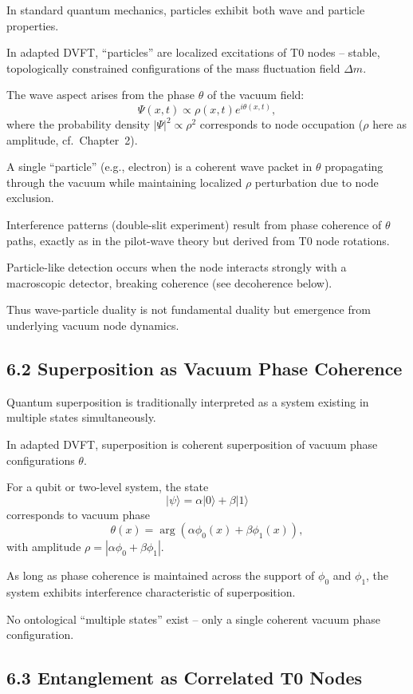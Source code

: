 	In standard quantum mechanics, particles exhibit both wave and particle properties.
	
	In adapted DVFT, ``particles'' are localized excitations of T0 nodes – stable, topologically constrained configurations of the mass fluctuation field $\Delta m$.
	
	The wave aspect arises from the phase $\theta$ of the vacuum field:
	\[
	\Psi(x,t) \propto \rho(x,t) e^{i\theta(x,t)},
	\]
	where the probability density $|\Psi|^2 \propto \rho^2$ corresponds to node occupation ($\rho$ here as amplitude, cf.\ Chapter~2).
	
	A single ``particle'' (e.g., electron) is a coherent wave packet in $\theta$ propagating through the vacuum while maintaining localized $\rho$ perturbation due to node exclusion.
	
	Interference patterns (double-slit experiment) result from phase coherence of $\theta$ paths, exactly as in the pilot-wave theory but derived from T0 node rotations.
	
	Particle-like detection occurs when the node interacts strongly with a macroscopic detector, breaking coherence (see decoherence below).
	
	Thus wave-particle duality is not fundamental duality but emergence from underlying vacuum node dynamics.
	
	\subsection{6.2 Superposition as Vacuum Phase Coherence}
	
	Quantum superposition is traditionally interpreted as a system existing in multiple states simultaneously.
	
	In adapted DVFT, superposition is coherent superposition of vacuum phase configurations $\theta$.
	
	For a qubit or two-level system, the state
	\[
	|\psi\rangle = \alpha |0\rangle + \beta |1\rangle
	\]
	corresponds to vacuum phase
	\[
	\theta(x) = \arg(\alpha \phi_0(x) + \beta \phi_1(x)),
	\]
	with amplitude $\rho = |\alpha \phi_0 + \beta \phi_1|$.
	
	As long as phase coherence is maintained across the support of $\phi_0$ and $\phi_1$, the system exhibits interference characteristic of superposition.
	
	No ontological ``multiple states'' exist – only a single coherent vacuum phase configuration.
	
	\subsection{6.3 Entanglement as Correlated T0 Nodes}
	
